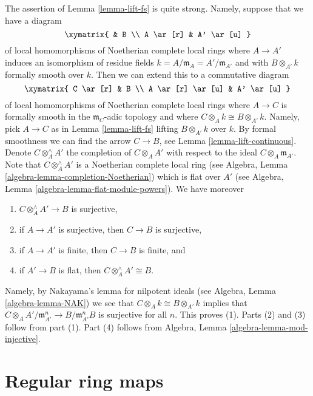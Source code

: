 \begin{remark}
\label{remark-what-does-it-mean}
The assertion of Lemma \ref{lemma-lift-fs} is quite strong. Namely,
suppose that we have a diagram
$$
\xymatrix{
& B \\
A \ar[r] & A' \ar[u]
}
$$
of local homomorphisms of Noetherian complete local rings where
$A \to A'$ induces an isomorphism of residue fields
$k = A/\mathfrak m_A = A'/\mathfrak m_{A'}$ and with
$B \otimes_{A'} k$ formally smooth over $k$.
Then we can extend this to a commutative diagram
$$
\xymatrix{
C \ar[r] & B \\
A \ar[r] \ar[u] & A' \ar[u]
}
$$
of local homomorphisms of Noetherian complete local rings
where $A \to C$ is formally smooth in the $\mathfrak m_C$-adic
topology and where $C \otimes_A k \cong B \otimes_{A'} k$.
Namely, pick $A \to C$ as in Lemma \ref{lemma-lift-fs}
lifting $B \otimes_{A'} k$ over $k$. By formal smoothness we
can find the arrow $C \to B$, see
Lemma \ref{lemma-lift-continuous}.
Denote $C \otimes_A^\wedge A'$ the completion of
$C \otimes_A A'$ with respect to the ideal $C \otimes_A \mathfrak m_{A'}$.
Note that $C \otimes_A^\wedge A'$ is a Noetherian complete local
ring (see Algebra, Lemma \ref{algebra-lemma-completion-Noetherian})
which is flat over $A'$ (see
Algebra, Lemma \ref{algebra-lemma-flat-module-powers}).
We have moreover
\begin{enumerate}
\item $C \otimes_A^\wedge A' \to B$ is surjective,
\item if $A \to A'$ is surjective, then $C \to B$ is surjective,
\item if $A \to A'$ is finite, then $C \to B$ is finite, and
\item if $A' \to B$ is flat, then $C \otimes_A^\wedge A' \cong B$.
\end{enumerate}
Namely, by Nakayama's lemma for nilpotent ideals (see
Algebra, Lemma \ref{algebra-lemma-NAK}) we see that
$C \otimes_A k \cong B \otimes_{A'} k$ implies that
$C \otimes_A A'/\mathfrak m_{A'}^n \to B/\mathfrak m_{A'}^nB$
is surjective for all $n$. This proves (1). Parts (2) and (3) follow
from part (1). Part (4) follows from
Algebra, Lemma \ref{algebra-lemma-mod-injective}.
\end{remark}




\section{Regular ring maps}
\label{section-regular}

